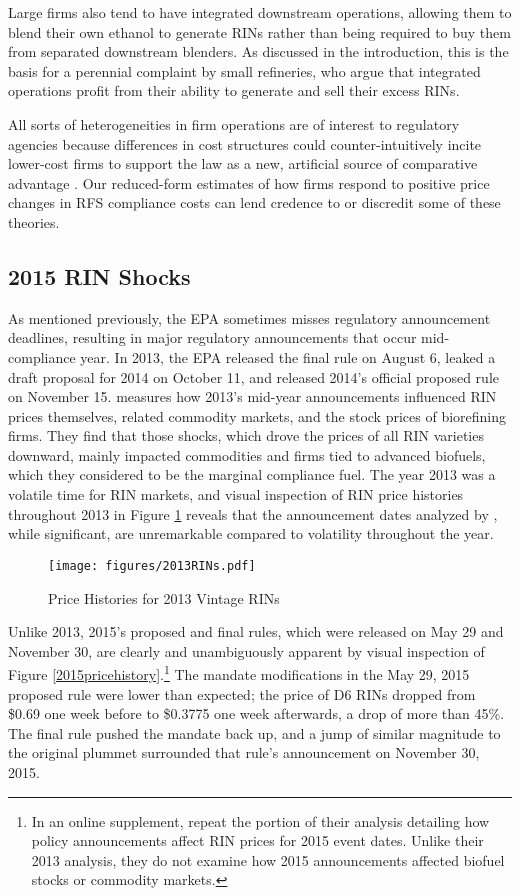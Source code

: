 \documentclass[11pt]{article}
\begin{document}
Large firms also tend to have integrated downstream operations, allowing them to blend their own ethanol to generate RINs rather than being required to buy them from separated downstream blenders. As discussed in the introduction, this is the basis for a perennial complaint by small refineries, who argue that integrated operations profit from their ability to generate and sell their excess RINs. 

All sorts of heterogeneities in firm operations are of interest to regulatory agencies because differences in cost structures could counter-intuitively incite lower-cost firms to support the law as a new, artificial source of comparative advantage \citep{Salop1983}. Our reduced-form estimates of how firms respond to positive price changes in RFS compliance costs can lend credence to or discredit some of these theories.

\subsection{2015 RIN Shocks} \label{sec_2015shocks}

As mentioned previously, the EPA sometimes misses regulatory announcement deadlines, resulting in major regulatory announcements that occur mid-compliance year. In 2013, the EPA released the final rule on August 6, leaked a draft proposal for 2014 on October 11, and released 2014's official proposed rule on November 15. \cite{Lade2018a} measures how 2013's mid-year announcements influenced RIN prices themselves, related commodity markets, and the stock prices of biorefining firms.  They find that those shocks, which drove the prices of all RIN varieties downward, mainly impacted commodities and firms tied to advanced biofuels, which they considered to be the marginal compliance fuel. The year 2013 was a volatile time for RIN markets, and visual inspection of RIN price histories throughout 2013 in Figure \ref{2013pricehistory} reveals that the announcement dates analyzed by \cite{Lade2018a}, while significant, are unremarkable compared to volatility throughout the year.

\begin{figure}[h]
	\caption{Price Histories for 2013 Vintage RINs}
	\label{2013pricehistory}
	\texttt{[image: figures/2013RINs.pdf]}
\end{figure} 

Unlike 2013, 2015's proposed and final rules, which were released on May 29 and November 30, are clearly and unambiguously apparent by visual inspection of Figure \ref{2015pricehistory}.\footnote{In an online supplement, \cite{Lade2018a} repeat the portion of their analysis detailing how policy announcements affect RIN prices for 2015 event dates. Unlike their 2013 analysis, they do not examine how 2015 announcements affected biofuel stocks or commodity markets.} The mandate modifications in the May 29, 2015 proposed rule were lower than expected; the price of D6 RINs dropped from \$0.69 one week before to \$0.3775 one week afterwards, a drop of more than 45\%. The final rule pushed the mandate back up, and a jump of similar magnitude to the original plummet surrounded that rule's announcement on November 30, 2015. 
\end{document}
